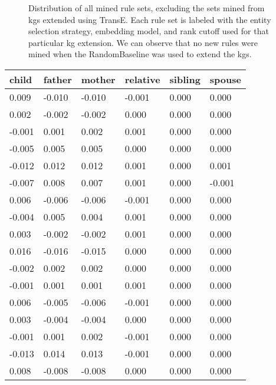 \begin{figure}[htbp]
\centering
    \centering
    
    \caption[Dist. of all sets of mined rules, excluding TransE.]{Distribution of all mined rule sets, excluding the sets mined from \glspl{kg} extended using TransE. Each rule set is labeled with the entity selection strategy, embedding model, and rank cutoff used for that particular \gls{kg} extension. We can observe that no new rules were mined when the RandomBaseline was used to extend the \glspl{kg}.}
    \label{all_sets_w_out_TransE}
\end{figure}


\begin{longtable}{llllll}
\textbf{child} & \textbf{father} & \textbf{mother} & \textbf{relative} & \textbf{sibling} & \textbf{spouse} \\ \hline
0.009  & -0.010 & -0.010 & -0.001   & 0.000   & 0.000  \\
0.002  & -0.002 & -0.002 & 0.000    & 0.000   & 0.000  \\
-0.001 & 0.001  & 0.002  & 0.001    & 0.000   & 0.000  \\
-0.005 & 0.005  & 0.005  & 0.000    & 0.000   & 0.000  \\
-0.012 & 0.012  & 0.012  & 0.001    & 0.000   & 0.001  \\
-0.007 & 0.008  & 0.007  & 0.001    & 0.000   & -0.001 \\
0.006  & -0.006 & -0.006 & -0.001   & 0.000   & 0.000  \\
-0.004 & 0.005  & 0.004  & 0.001    & 0.000   & 0.000  \\
0.003  & -0.002 & -0.002 & 0.001    & 0.000   & 0.000  \\
0.016  & -0.016 & -0.015 & 0.000    & 0.000   & 0.000  \\
-0.002 & 0.002  & 0.002  & 0.000    & 0.000   & 0.000  \\
-0.001 & 0.001  & 0.001  & 0.001    & 0.000   & 0.000  \\
0.006  & -0.005 & -0.006 & -0.001   & 0.000   & 0.000  \\
0.003  & -0.004 & -0.004 & 0.000    & 0.000   & 0.000  \\
-0.001 & 0.001  & 0.002  & -0.001   & 0.000   & 0.000  \\
-0.013 & 0.014  & 0.013  & -0.001   & 0.000   & 0.000  \\
0.008  & -0.008 & -0.008 & 0.000    & 0.000   & 0.000  \\

\end{longtable}
